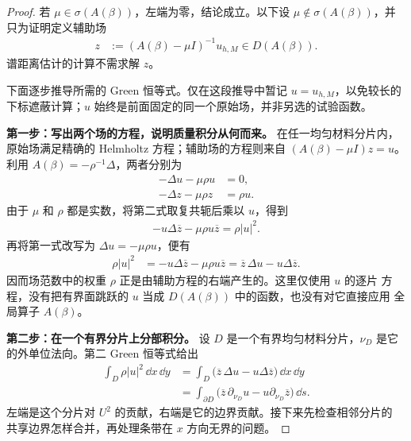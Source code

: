 \begin{proof}
  若 $\mu\in\sigma(A(\beta))$，左端为零，结论成立。以下设
  $\mu\notin\sigma(A(\beta))$，并只为证明定义辅助场
  \begin{align}
    z&:=(A(\beta)-\mu I)^{-1}u_{h,M}
    \in D(A(\beta)).
    \label{eq:auxiliary-resolvent-field}
  \end{align}
  谱距离估计的计算不需求解 $z$。

  下面逐步推导所需的 Green 恒等式。仅在这段推导中暂记 $u=u_{h,M}$，以免较长的
  下标遮蔽计算；$u$ 始终是前面固定的同一个原始场，并非另选的试验函数。

  \smallskip\noindent
  \textbf{第一步：写出两个场的方程，说明质量积分从何而来。}
  在任一均匀材料分片内，原始场满足精确的 Helmholtz 方程；辅助场的方程则来自
  $(A(\beta)-\mu I)z=u$。利用 $A(\beta)=-\rho^{-1}\Delta$，两者分别为
  \begin{align*}
    -\Delta u-\mu\rho u&=0,\\
    -\Delta z-\mu\rho z&=\rho u.
  \end{align*}
  由于 $\mu$ 和 $\rho$ 都是实数，将第二式取复共轭后乘以 $u$，得到
  \begin{align*}
    -u\Delta\overline z-\mu\rho u\overline z=\rho|u|^2.
  \end{align*}
  再将第一式改写为 $\Delta u=-\mu\rho u$，便有
  \begin{align*}
    \rho|u|^2
    &= -u\Delta\overline z-\mu\rho u\overline z
     =\overline z\,\Delta u-u\Delta\overline z.
  \end{align*}
  因而场范数中的权重 $\rho$ 正是由辅助方程的右端产生的。这里仅使用 $u$ 的逐片
  方程，没有把有界面跳跃的 $u$ 当成 $D(A(\beta))$ 中的函数，也没有对它直接应用
  全局算子 $A(\beta)$。

  \smallskip\noindent
  \textbf{第二步：在一个有界分片上分部积分。}
  设 $D$ 是一个有界均匀材料分片，$\nu_D$ 是它的外单位法向。第二 Green 恒等式给出
  \begin{align*}
    \int_D\rho|u|^2\,\dd x\,\dd y
    &=\int_D\bigl(\overline z\,\Delta u-u\Delta\overline z\bigr)
      \,\dd x\,\dd y\\
    &=\int_{\partial D}
      \bigl(\overline z\,\partial_{\nu_D}u
        -u\partial_{\nu_D}\overline z\bigr)\,\dd s.
  \end{align*}
  左端是这个分片对 $U^2$ 的贡献，右端是它的边界贡献。接下来先检查相邻分片的
  共享边界怎样合并，再处理条带在 $x$ 方向无界的问题。


\end{proof}
